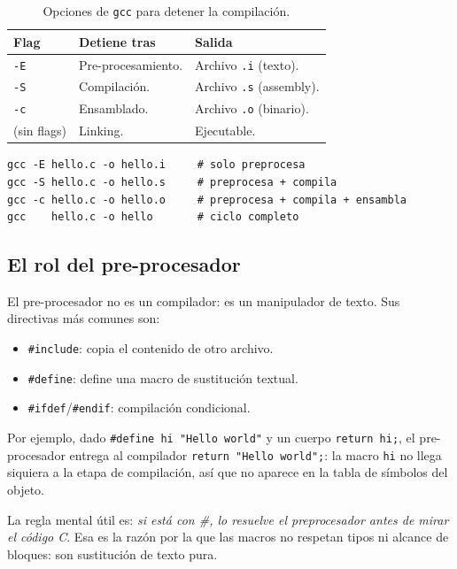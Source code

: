 \documentclass[11pt,a4paper]{article}
\begin{document}
\begin{table}[h]
\centering
\small
\begin{tabular}{l p{8cm} l}
\toprule
\textbf{Flag} & \textbf{Detiene tras} & \textbf{Salida} \\
\midrule
\texttt{-E} & Pre-procesamiento. & Archivo \texttt{.i} (texto). \\
\texttt{-S} & Compilación.       & Archivo \texttt{.s} (assembly). \\
\texttt{-c} & Ensamblado.        & Archivo \texttt{.o} (binario). \\
(sin flags)  & Linking.           & Ejecutable. \\
\bottomrule
\end{tabular}
\caption{Opciones de \texttt{gcc} para detener la compilación.}
\end{table}

\begin{lstlisting}
gcc -E hello.c -o hello.i     # solo preprocesa
gcc -S hello.c -o hello.s     # preprocesa + compila
gcc -c hello.c -o hello.o     # preprocesa + compila + ensambla
gcc    hello.c -o hello       # ciclo completo
\end{lstlisting}

\subsection{El rol del pre-procesador}

El pre-procesador no es un compilador: es un manipulador de texto. Sus
directivas más comunes son:

\begin{itemize}[leftmargin=*]
    \item \texttt{\#include}: copia el contenido de otro archivo.
    \item \texttt{\#define}: define una macro de sustitución textual.
    \item \texttt{\#ifdef}/\texttt{\#endif}: compilación condicional.
\end{itemize}

Por ejemplo, dado \texttt{\#define hi "Hello world"} y un cuerpo
\texttt{return hi;}, el pre-procesador entrega al compilador
\texttt{return "Hello world";}: la macro \texttt{hi} no llega siquiera
a la etapa de compilación, así que no aparece en la tabla de símbolos
del objeto.

\begin{idea}
La regla mental útil es: \emph{si está con \#, lo resuelve el
preprocesador antes de mirar el código C}. Esa es la razón por la que
las macros no respetan tipos ni alcance de bloques: son sustitución de
texto pura.
\end{idea}
\end{document}
